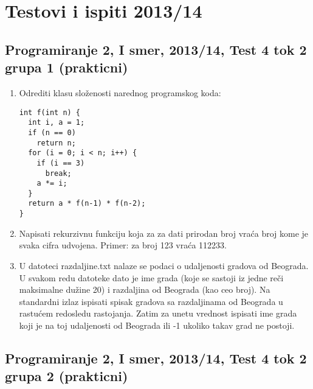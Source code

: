 \chapter{Testovi i ispiti 2013/14}



\section{Programiranje 2, I smer, 2013/14, Test 4 tok 2 grupa 1 (prakticni)}


\begin{enumerate}
\item Odrediti klasu slo\v zenosti narednog programskog koda:
\begin{verbatim}
int f(int n) {
  int i, a = 1;
  if (n == 0)
    return n;
  for (i = 0; i < n; i++) {
    if (i == 3)
      break;
    a *= i;
  }
  return a * f(n-1) * f(n-2);
}
\end{verbatim}

\item Napisati rekurzivnu funkciju koja za za dati prirodan broj vra\'ca broj kome je
      svaka cifra udvojena.
      Primer: za broj 123 vra\'ca 112233.



\item U datoteci razdaljine.txt nalaze se podaci o udaljenosti gradova od Beograda.
U svakom redu datoteke dato je ime grada (koje se sastoji iz jedne re\v ci maksimalne du\v zine 20) i
razdaljina od Beograda (kao ceo broj). Na standardni izlaz ispisati spisak
gradova sa razdaljinama od Beograda u rastu\'cem redosledu rastojanja.
Zatim za unetu vrednost ispisati ime grada koji je na toj udaljenosti od
Beograda ili -1 ukoliko takav grad ne postoji.

\end{enumerate}


\section{Programiranje 2, I smer, 2013/14, Test 4 tok 2 grupa 2 (prakticni)}


